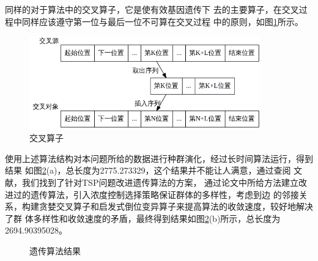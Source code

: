 \documentclass[fontset=windows,a4paper,12pt]{ctexart}
\begin{document}
      同样的对于算法中的交叉算子，它是使有效基因遗传下
      去的主要算子，在交叉过程中同样应该遵守第一位与最后一位不可算在交叉过程
      中的原则，如图\ref{fig:cross}所示。
      \begin{figure}[!htbp]
      	\centering
      	\includegraphics[width=10cm]{pic/life_cross.png}
      	\caption{交叉算子}
      	\label{fig:cross}
      \end{figure}
      
      使用上述算法结构对本问题所给的数据进行种群演化，经过长时间算法运行，得到结果
      如图\ref{fig:ga}(a)，总长度为2775.273329，这个结果并不能让人满意，通过查阅
      文献，我们找到了针对TSP问题改进遗传算法的方案\cite{谢胜利2002求解}，
      通过论文中所给方法建立改进过的遗传算法，引入浓度控制选择策略保证群体的多样性，考虑到边
      的邻接关系，构建贪婪交叉算子和启发式倒位变异算子来提高算法的收敛速度，较好地解决了群
      体多样性和收敛速度的矛盾，最终得到结果如图\ref{fig:ga}(b)所示，总长度为2694.90395028。
      \begin{figure}[!htbp]
      	\centering
      	\caption{遗传算法结果}
      	\label{fig:ga}
      \end{figure}
      
\end{document}
